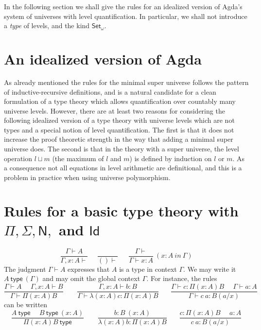 \documentclass[10pt,a4paper]{article}
\newcommand{\Id}{\mathsf{Id}}
\newcommand{\type}{\mathsf{type}}
\newcommand{\N}{\mathsf{N}}
\newcommand{\Set}{\mathsf{Set}}
\begin{document}
In the following section we shall give the rules for an idealized version of Agda's system of universes with level quantification. In particular, we shall not introduce a {\em type} of levels, and the kind $\Set_\omega$. 

\section{An idealized version of Agda}

As already mentioned the rules for the minimal super universe follows the pattern of inductive-recursive definitions, and is a natural candidate for a clean formulation of a type theory which allows quantification over countably many universe levels. However, there are at least two reasons for considering the following idealized version of a type theory with universe levels which are not types and a special notion of level quantification. The first is that it does not increase the proof theoretic strength in the way that adding a minimal super universe does. The second is that in the theory with a super universe, the level operation $l \sqcup m$ (the maximum of $l$ and $m$) is defined by induction on $l$ or $m$. As a consequence not all equations in level arithmetic are definitional, and this is a problem in practice when using universe polymorphism.

\section*{Rules for a basic type theory with $\Pi, \Sigma, \N,$ and $\Id$}

$$
\frac{\Gamma\vdash A}{\Gamma,x:A\vdash}~~~~~~\frac{}{()\vdash}~~~~~~~
\frac{\Gamma\vdash}{\Gamma\vdash x:A}~(x\!:\! A~in~\Gamma)
$$
The judgment $\Gamma\vdash A$ expresses that $A$ is a type in context $\Gamma$.
We may write it $A~\type~(\Gamma)$ and may omit the global context $\Gamma$.
For instance, the rules
$$
\frac{\Gamma\vdash A~~~~~~\Gamma,x:A\vdash B}{\Gamma\vdash \Pi (x:A) B}~~~~~~~~~
\frac{\Gamma,x:A\vdash b:B}{\Gamma\vdash \lambda (x:A) c:\Pi (x:A) B}~~~~~~~~
\frac{\Gamma\vdash c:\Pi (x:A) B~~~~~~\Gamma\vdash a:A}
     {\Gamma\vdash c~a:B(a/x)}
$$
can be written
$$
\frac{A~\type~~~~~~B~\type~(x:A)}{\Pi (x:A) B~\type}~~~~~~~~~
\frac{b:B~(x:A)}{\lambda (x:A) b:\Pi (x:A) B}~~~~~~~~
\frac{c:\Pi (x:A) B~~~~~~a:A}
     {c~a:B(a/x)}
$$
\end{document}
